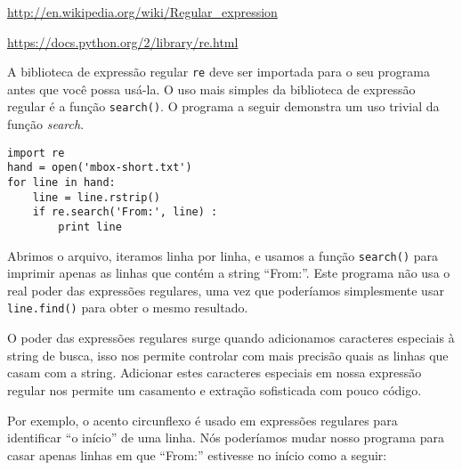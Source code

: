 \url{http://en.wikipedia.org/wiki/Regular_expression}

\url{https://docs.python.org/2/library/re.html}

A biblioteca de expressão regular {\tt re} deve ser importada para o seu
programa antes que você possa usá-la. O uso mais simples da biblioteca de
expressão regular é a função {\tt search()}. O programa a seguir demonstra
um uso trivial da função {\it search}.


\beforeverb
\begin{verbatim}
import re
hand = open('mbox-short.txt')
for line in hand:
    line = line.rstrip()
    if re.search('From:', line) :
        print line
\end{verbatim}
\afterverb
%

Abrimos o arquivo, iteramos linha por linha, e usamos a função {\tt search()}
para imprimir apenas as linhas que contém a string ``From:''. Este programa
não usa o real poder das expressões regulares, uma vez que poderíamos
simplesmente usar {\tt line.find()} para obter o mesmo resultado.



O poder das expressões regulares surge quando adicionamos caracteres especiais
à string de busca, isso nos permite controlar com mais precisão quais as
linhas que casam com a string. Adicionar estes caracteres especiais em nossa
expressão regular nos permite um casamento e extração sofisticada com pouco
código.

Por exemplo, o acento circunflexo é usado em expressões regulares para
identificar ``o início'' de uma linha. Nós poderíamos mudar nosso programa
para casar apenas linhas em que ``From:'' estivesse no início como a seguir:

